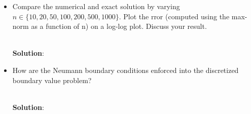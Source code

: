 \documentclass{article}
\newcommand{\soln}{\\ \textbf{Solution}: }
\begin{document}
\begin{enumerate}
\begin{itemize}
        \soln

    \item Compare the numerical and exact solution by varying $n \in
        \{10,20,50,100,200,500,1000\}$. Plot the rror (computed using the max-norm as a
        function of n) on a log-log plot. Discuss your result.

        \soln

    \item How are the Neumann boundary conditions enforced into the discretized boundary
        value problem?

        \soln

\end{itemize}

\end{enumerate}
\end{document}
